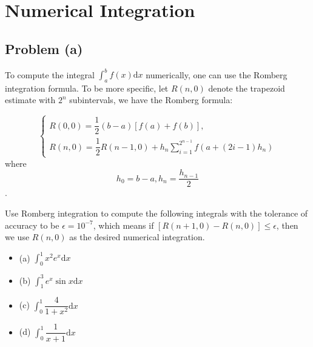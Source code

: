 \documentclass[UTF8,hyperref]{article}
\begin{document}
\section{Numerical Integration}
\subsection{Problem (a)}
\par To compute the integral $\displaystyle\int_{a}^{b}{f(x)}\mathrm{d}x$ numerically, one can use the Romberg integration formula. To be more specific, let $R(n, 0)$ denote the trapezoid estimate with $2^n$ subintervals, we have the Romberg formula:

\begin{equation}
\begin{cases}
R(0,0)=\dfrac{1}{2}(b-a)[f(a)+f(b)],\\
\displaystyle{R(n,0)=\dfrac{1}{2}R(n-1,0)+h_n\sum_{i=1}^{2^{n-1}}{f(a+(2i-1)h_n)}}
\end{cases}
\end{equation}
where 
\begin{equation}
h_0=b-a, h_n=\dfrac{h_{n-1}}{2}
\end{equation}.
\par Use Romberg integration to compute the following integrals with the tolerance of accuracy to be $\epsilon=10^{-7}$, which means if $[R(n+1,0)-R(n,0)]\le\epsilon$, then we use $R(n,0)$ as the desired numerical integration.

\begin{itemize}
    \item (a) $\displaystyle{\int_{0}^{1}{x^2e^x}\mathrm{d}x}$
    \item (b) $\displaystyle{\int_{1}^{3}{e^x\sin{x}}\mathrm{d}x}$
    \item (c) $\displaystyle{\int_{0}^{1}{\dfrac{4}{1+x^2}}\mathrm{d}x}$
    \item (d) $\displaystyle{\int_{0}^{1}{\dfrac{1}{x+1}}\mathrm{d}x}$
\end{itemize}
\end{document}
